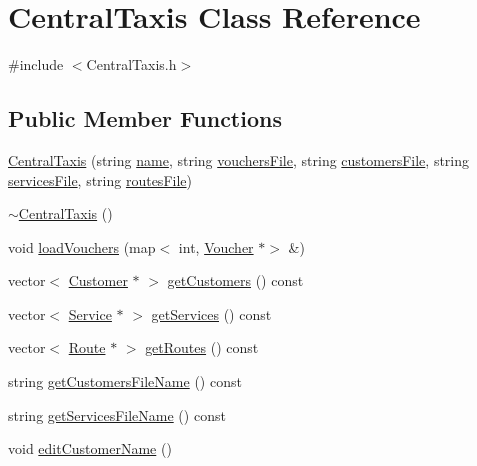 \hypertarget{classCentralTaxis}{}\section{Central\+Taxis Class Reference}
\label{classCentralTaxis}


{\ttfamily \#include $<$Central\+Taxis.\+h$>$}

\subsection*{Public Member Functions}
\begin{DoxyCompactItemize}
\item 
\hyperlink{classCentralTaxis_aca0cca3a2df44dadf8bfcb71b3636739}{Central\+Taxis} (string \hyperlink{classCentralTaxis_ab651d92a544bb7910586183aef0b5ff6}{name}, string \hyperlink{classCentralTaxis_a6b4866b7ea58f6672dfab0677cc7a3ed}{vouchers\+File}, string \hyperlink{classCentralTaxis_a658c8ac7923a5f759da1545a21416532}{customers\+File}, string \hyperlink{classCentralTaxis_a0c57e6ffde520f8145edd96eb0e1fe22}{services\+File}, string \hyperlink{classCentralTaxis_af411ccf9a02306f4fb6343607ad9b751}{routes\+File})
\item 
\hyperlink{classCentralTaxis_a3a39063e06963a5465f0fcb9ed34ac14}{$\sim$\+Central\+Taxis} ()
\item 
void \hyperlink{classCentralTaxis_a487d12631006ffef10f96d8dd74a1bf5}{load\+Vouchers} (map$<$ int, \hyperlink{classVoucher}{Voucher} $\ast$$>$ \&)
\item 
vector$<$ \hyperlink{classCustomer}{Customer} $\ast$ $>$ \hyperlink{classCentralTaxis_a906b443fab8b19ebadb141c83bb769c7}{get\+Customers} () const
\item 
vector$<$ \hyperlink{classService}{Service} $\ast$ $>$ \hyperlink{classCentralTaxis_af1d3832f3a1c96b78d04b4970cd8f777}{get\+Services} () const
\item 
vector$<$ \hyperlink{classRoute}{Route} $\ast$ $>$ \hyperlink{classCentralTaxis_a16d7310cd6a72a69855756902aec68ec}{get\+Routes} () const
\item 
string \hyperlink{classCentralTaxis_a64985fb9b31e49a68b9f70450ce59c88}{get\+Customers\+File\+Name} () const
\item 
string \hyperlink{classCentralTaxis_a28391cdefa6db5676197fbea2c031160}{get\+Services\+File\+Name} () const
\item 
void \hyperlink{classCentralTaxis_a085236a6f7fed6b8bb9fa76321c66bb3}{edit\+Customer\+Name} ()
\item 
$$
\end{DoxyCompactItemize}
